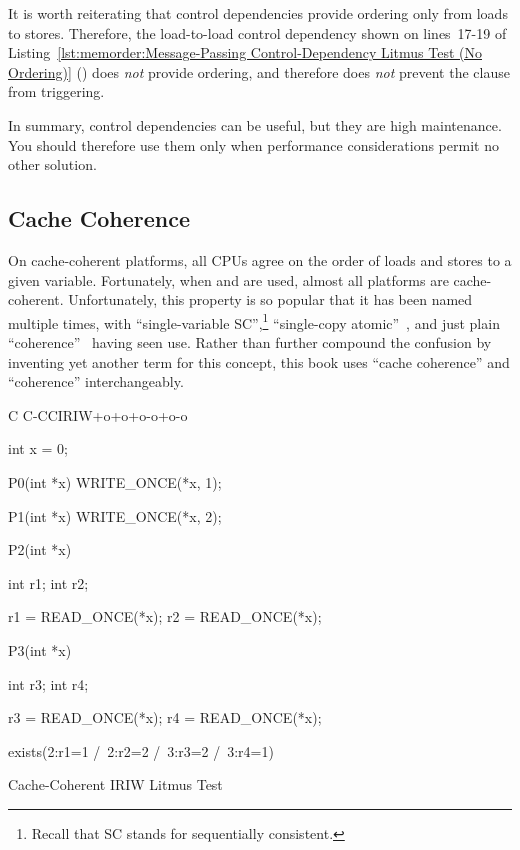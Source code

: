 It is worth reiterating that control dependencies provide ordering only
from loads to stores.
Therefore, the load-to-load control dependency shown on lines~17-19 of
Listing~\ref{lst:memorder:Message-Passing Control-Dependency Litmus Test (No Ordering)}
()
does \emph{not} provide ordering, and therefore does \emph{not}
prevent the  clause from triggering.

In summary, control dependencies can be useful, but they are high
maintenance.
You should therefore use them only when performance considerations
permit no other solution.

\subsection{Cache Coherence}
\label{sec:memorder:Cache Coherence}

On cache-coherent platforms, all CPUs agree on the order of loads and
stores to a given variable.
Fortunately, when  and  are used,
almost all platforms are cache-coherent.
Unfortunately, this property is so popular that it has been named
multiple times, with ``single-variable SC'',\footnote{
	Recall that SC stands for sequentially consistent.}
``single-copy atomic''~\cite{Stone:1995:SP:623262.623912},
and just plain ``coherence''~\cite{JadeAlglave2011ppcmem}
having seen use.
Rather than further compound the confusion by inventing yet another term
for this concept, this book uses ``cache coherence'' and ``coherence''
interchangeably.

\begin{listing}[tbp]
{ \scriptsize
\begin{verbbox}[\LstLineNo]
C C-CCIRIW+o+o+o-o+o-o

{
int x = 0;
}

P0(int *x)
{
  WRITE_ONCE(*x, 1);
}

P1(int *x)
{
  WRITE_ONCE(*x, 2);
}

P2(int *x)
{
  int r1;
  int r2;

  r1 = READ_ONCE(*x);
  r2 = READ_ONCE(*x);
}

P3(int *x)
{
  int r3;
  int r4;

  r3 = READ_ONCE(*x);
  r4 = READ_ONCE(*x);
}

exists(2:r1=1 /\ 2:r2=2 /\ 3:r3=2 /\ 3:r4=1)
\end{verbbox}
}
\centering
\theverbbox
\caption{Cache-Coherent IRIW Litmus Test}
\label{lst:memorder:Cache-Coherent IRIW Litmus Test}
\end{listing}


